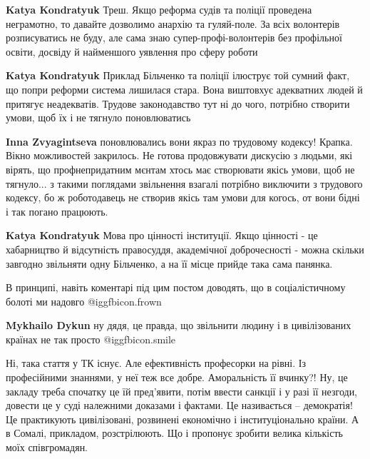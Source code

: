 \begin{itemize}
\begin{itemize}
\textbf{Katya Kondratyuk} Треш. Якщо реформа судів та поліції проведена неграмотно, то давайте дозволимо анархію та гуляй-поле. За всіх волонтерів розписуватись не буду, але сама знаю супер-профі-волонтерів без профільної освіти, досвіду й найменшого уявлення про сферу роботи

\textbf{Katya Kondratyuk} Приклад Більченко та поліції ілюструє той сумний факт, що попри реформи система лишилася стара. Вона виштовхує адекватних людей й притягує неадекватів. Трудове законодавство тут ні до чого, потрібно створити умови, щоб їх і не тягнуло поновлюватись

\textbf{Inna Zvyagintseva} поновлювались вони якраз по трудовому кодексу! Крапка. Вікно можливостей закрилось. Не готова продовжувати дискусію з людьми, які вірять, що профнепридатним мєнтам хтось має створювати якісь умови, щоб не тягнуло... з такими поглядами звільнення взагалі потрібно виключити з трудового кодексу, бо ж роботодавець не створив якісь там умови для когось, от вони бідні і так погано працюють.

\textbf{Katya Kondratyuk} Мова про цінності інституції. Якщо цінності - це хабарництво й відсутність правосуддя, академічної доброчесності - можна скільки завгодно звільняти одну Більченко, а на її місце прийде така сама панянка.

\end{itemize} %

В принципі, навіть коментарі під цим постом доводять, що в соціалістичному болоті ми надовго  @igg{fbicon.frown} 

\begin{itemize} %
\textbf{Mykhailo Dykun} ну дядя, це правда, що звільнити людину і в цивілізованих країнах не так просто  @igg{fbicon.smile} 
\end{itemize} %


Ні, така стаття у ТК існує. Але ефективність професорки на рівні. Із
професійними знаннями, у неї теж все добре. Аморальність її вчинку?! Ну, це
закладу треба спочатку це їй пред'явити, потім ввести санкції і у разі її
незгоди, довести це у суді належними доказами і фактами. Це називається –
демократія! Це практикують цивілізовані, розвинені економічно і
інституціонально країни. А в Сомалі, прикладом, розстрілюють. Що і пропонує
зробити велика кількість моїх співгромадян.


\end{itemize}
